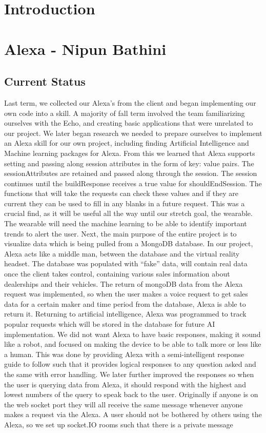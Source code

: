 \documentclass[onecolumn, draftclsnofoot,10pt, compsoc]{IEEEtran}
\begin{document}
\newpage
{}
\tableofcontents
\clearpage

\section{Introduction}

\section{Alexa - Nipun Bathini}
    \subsection{Current Status}
    Last term, we collected our Alexa’s from the client and began implementing our own code into a skill. A majority of fall term involved the team familiarizing ourselves with the Echo, and creating basic applications that were unrelated to our project. We later began research we needed to prepare ourselves to implement an Alexa skill for our own project, including finding Artificial Intelligence and Machine learning packages for Alexa. From this we learned that Alexa supports setting and passing along session attributes in the form of key: value pairs. The sessionAttributes are retained and passed along through the session. The session continues until the buildResponse receives a true value for shouldEndSession. The functions that will take the requests can check these values and if they are current they can be used to fill in any blanks in a future request. This was a crucial find, as it will be useful all the way until our stretch goal, the wearable. The wearable will need the machine learning to be able to identify important trends to alert the user. Next, the main purpose of the entire project is to visualize data which is being pulled from a MongoDB database. In our project, Alexa acts like a middle man, between the database and the virtual reality headset. The database was populated with “fake” data, will contain real data once the client takes control, containing various sales information about dealerships and their vehicles. The return of mongoDB data from the Alexa request was implemented, so when the user makes a voice request to get sales data for a certain maker and time period from the database, Alexa is able to return it. Returning to artificial intelligence, Alexa was programmed to track popular requests which will be stored in the database for future AI implementation. We did not want Alexa to have basic responses, making it sound like a robot, and focused on making the device to be able to talk more or less like a human. This was done by providing Alexa with a semi-intelligent response guide to follow such that it provides logical responses to any question asked and the same with error handling. We later further improved the responses so when the user is querying data from Alexa, it should respond with the highest and lowest numbers of the query to speak back to the user. Originally if anyone is on the web socket port they will all receive the same message whenever anyone makes a request via the Alexa. A user should not be bothered by others using the Alexa, so we set up socket.IO rooms such that there is a private message 
\end{document}
